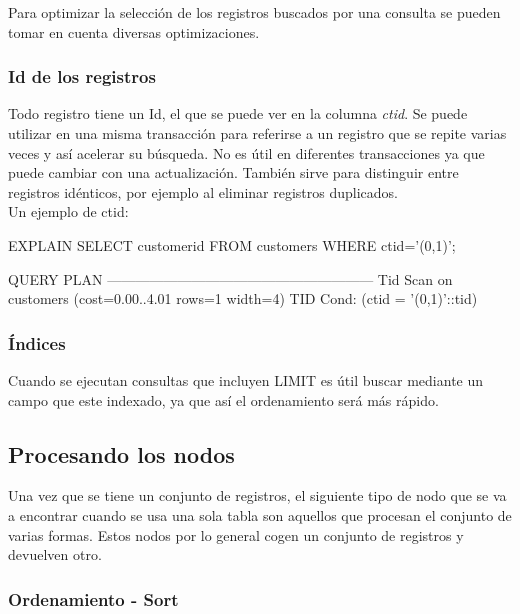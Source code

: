 Para optimizar la selección de los registros buscados por una consulta se pueden tomar en cuenta diversas optimizaciones.

\subsubsection{Id de los registros}

Todo registro tiene un Id, el que se puede ver en la columna \textit{ctid}. Se puede utilizar en una misma transacción para referirse a un registro que se repite varias veces y así acelerar su búsqueda. No es útil en diferentes transacciones ya que puede cambiar con una actualización. También sirve para distinguir entre registros idénticos, por ejemplo al eliminar registros duplicados.\\

Un ejemplo de ctid:\\

\begin{pyglist}
EXPLAIN SELECT customerid FROM customers WHERE ctid='(0,1)';

                       QUERY PLAN                        
---------------------------------------------------------
 Tid Scan on customers  (cost=0.00..4.01 rows=1 width=4)
   TID Cond: (ctid = '(0,1)'::tid)
\end{pyglist}

\subsubsection{Índices}

Cuando se ejecutan consultas que incluyen LIMIT es útil buscar mediante un campo que este indexado, ya que así el ordenamiento será más rápido.

\subsection{Procesando los nodos} 

Una vez que se tiene un conjunto de registros, el siguiente tipo de nodo que se va a encontrar cuando se usa una sola tabla son aquellos que procesan el conjunto de varias formas. Estos nodos por lo general cogen un conjunto de registros y devuelven otro.

\subsubsection{Ordenamiento - Sort}

